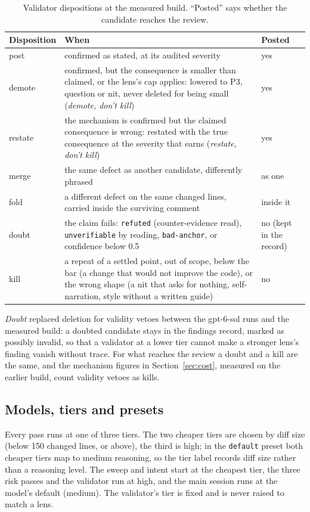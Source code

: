 \documentclass[11pt,a4paper]{article}
\newcommand{\code}[1]{\texttt{#1}}
\begin{document}
\begin{table}[!tbp]
\centering
\small
\caption{Validator dispositions at the measured build. ``Posted'' says
whether the candidate reaches the review.}
\label{tab:dispositions}
\begin{tabularx}{\textwidth}{@{}l X l@{}}
\toprule
Disposition & When & Posted \\
\midrule
post & confirmed as stated, at its audited severity & yes \\
demote & confirmed, but the consequence is smaller than claimed, or the lens's cap applies: lowered to P3, question or nit, never deleted for being small (\emph{demote, don't kill}) & yes \\
restate & the mechanism is confirmed but the claimed consequence is wrong: restated with the true consequence at the severity that earns (\emph{restate, don't kill}) & yes \\
merge & the same defect as another candidate, differently phrased & as one \\
fold & a different defect on the same changed lines, carried inside the surviving comment & inside it \\
doubt & the claim fails: \code{refuted} (counter-evidence read), \code{unverifiable} by reading, \code{bad-anchor}, or confidence below 0.5 & no (kept in the record) \\
kill & a repeat of a settled point, out of scope, below the bar (a change that would not improve the code), or the wrong shape (a nit that asks for nothing, self-narration, style without a written guide) & no \\
\bottomrule
\end{tabularx}
\end{table}

\emph{Doubt} replaced deletion for validity vetoes between the gpt-6-sol
runs and the measured build: a doubted candidate stays in the findings
record, marked as possibly invalid, so that a validator at a lower tier
cannot make a stronger lens's finding vanish without trace. For what reaches
the review a doubt and a kill are the same, and the mechanism figures in
Section~\ref{sec:cost}, measured on the earlier build, count validity vetoes
as kills.

\subsection{Models, tiers and presets}
\label{sec:presets}

Every pass runs at one of three tiers. The two cheaper tiers are chosen by
diff size (below 150 changed lines, or above), the third is high; in the
\code{default} preset both cheaper tiers map to medium reasoning, so the
tier label records diff size rather than a reasoning level. The sweep and
intent start at the cheapest tier, the three risk passes and the validator
run at high, and the main session runs at the model's default (medium).
The validator's tier is fixed and is never raised to match a lens.
\end{document}
